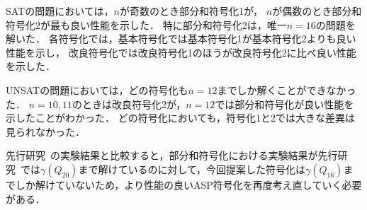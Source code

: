 \newpage
SATの問題においては，$n$が奇数のとき部分和符号化1が，
$n$が偶数のとき部分和符号化2が最も良い性能を示した．
特に部分和符号化2は，唯一$n=16$の問題を解いた．
各符号化では，基本符号化では基本符号化1が基本符号化2よりも良い性能を示し，
改良符号化では改良符号化1のほうが改良符号化2に比べ良い性能を示した．

UNSATの問題においては，どの符号化も$n=12$までしか解くことができなかった．
$n=10,11$のときは改良符号化2が，$n=12$では部分和符号化が良い性能を示したことがわかった．
どの符号化においても，符号化1と2では大きな差異は見られなかった．

先行研究~\cite{yamamoto21}の実験結果と比較すると，部分和符号化における実験結果が先行研究~\cite{yamamoto21}では$\gamma(Q_{20})$まで解けているのに対して，今回提案した符号化は$\gamma(Q_{16})$までしか解けていないため，より性能の良いASP符号化を再度考え直していく必要がある．
